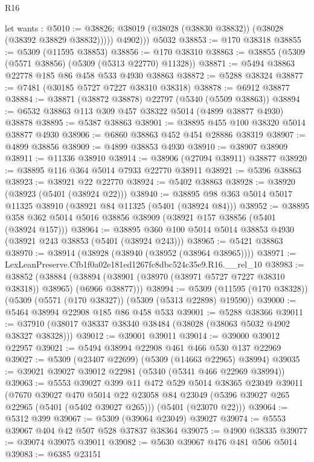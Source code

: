 \begin{lexlean}{R16}
\begin{coremodule}
            let wants : @5010 := @38826;
            @38019 (@38028 (@38830 @38832)) (@38028 (@38392 @38829 @38832)))))
          @4902)))
    @5032
@38853 := @170 @38318
@38855 := @5309 (@11595 @38853)
@38856 := @170 @38310
@38863 := @38855 (@5309 (@5571 @38856) (@5309 (@5313 @22770) @11328))
@38871 := @5494 @38863 @22778 @185 @86 @458 @533 @4930 @38863
@38872 := @5288 @38324
@38877 := @7481 (@30185 @5727 @7227 @38310 @38318)
@38878 := @6912 @38877
@38884 := @38871 (@38872 @38878) @22797 (@5340 (@5509 @38863))
@38894 := @6532 @38863 @113 @309 @457 @38322 @5014 (@4899 @38877 @4930) @38878
@38895 := @5387 @38863
@38901 := @38895 @455 @100 @38320 @5014 @38877 @4930
@38906 := @6860 @38863 @452 @454 @28886 @38319
@38907 := @4899 @38856
@38909 := @4899 @38853 @4930
@38910 := @38907 @38909
@38911 := @11336 @38910
@38914 := @38906 (@27094 @38911) @38877
@38920 := @38895 @116 @364 @5014 @7933 @22770 @38911
@38921 := @5396 @38863
@38923 := @38921 @22 @22770
@38924 := @5402 @38863
@38928 := @38920 (@38923 (@5401 (@38924 @22)))
@38940 := @38895 @98 @363 @5014 @5017 @11325 @38910 (@38921 @84 @11325 (@5401 (@38924 @84)))
@38952 := @38895 @358 @362 @5014 @5016 @38856 @38909 (@38921 @157 @38856 (@5401 (@38924 @157)))
@38964 := @38895 @360 @100 @5014 @5014 @38853 @4930 (@38921 @243 @38853 (@5401 (@38924 @243)))
@38965 := @5421 @38863
@38970 := @38914 (@38928 (@38940 (@38952 (@38964 @38965))))
@38971 := LexLeanPreserve.Cfb1f0a02e181ed1267fc8dbc524c35e9.R16.__rel_10
@38983 := @38852
    (@38884 (@38894 (@38901 (@38970 (@38971 @5727 @7227 @38310 @38318)) @38965) (@6966 @38877)))
@38994 := @5309 (@11595 (@170 @38328)) (@5309 (@5571 (@170 @38327)) (@5309 (@5313 @22898) @19590))
@39000 := @5464 @38994 @22908 @185 @86 @458 @533
@39001 := @5288 @38366
@39011 := @37910 (@38017 @38337 @38340 @38484 (@38028 (@38063 @5032 @4902 @38327 @38328)))
@39012 := @39001 @39011
@39014 := @39000 @39012 @22957
@39021 := @5494 @38994 @22908 @461 @466 @530 @137 @22969
@39027 := @5309 (@23407 @22699) (@5309 (@14663 @22965) @38994)
@39035 := @39021 @39027 @39012 @22981 (@5340 (@5341 @466 @22969 @38994))
@39063 := @5553
    @39027
    @399
    @11
    @472
    @529
    @5014
    @38365
    @23049
    @39011
    (@7670
      @39027
      @470
      @5014
      @22
      @23058
      @84
      @23049
      (@5396 @39027 @265 @22965 (@5401 (@5402 @39027 @265)))
      (@5401 (@23070 @22)))
@39064 := @5312 @399
@39067 := @5309 (@39064 @23049) @39027
@39074 := @5553 @39067 @404 @42 @507 @528 @37837 @38364
@39075 := @4900 @38335
@39077 := @39074 @39075 @39011
@39082 := @5630 @39067 @476 @481 @506 @5014
@39083 := @6385 @23151

\end{coremodule}
\end{lexlean}
